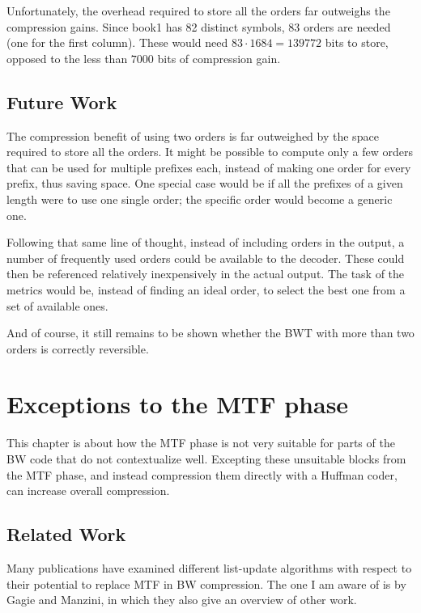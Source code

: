 \documentclass[a4paper]{scrreprt}
\begin{document}
Unfortunately, the overhead required to store all the orders far outweighs the
compression gains. Since book1 has 82 distinct symbols, 83 orders are needed
(one for the first column). These would need \(83 \cdot 1684 = 139772\) bits to
store, opposed to the less than \(7000\) bits of compression gain.

\section{Future Work}

The compression benefit of using two orders is far outweighed by the space
required to store all the orders. It might be possible to compute only a few
orders that can be used for multiple prefixes each, instead of making one order
for every prefix, thus saving space. One special case would be if all the
prefixes of a given length were to use one single order; the specific order
would become a generic one.

Following that same line of thought, instead of including orders in the output,
a number of frequently used orders could be available to the decoder. These
could then be referenced relatively inexpensively in the actual output. The task
of the metrics would be, instead of finding an ideal order, to select the best
one from a set of available ones.

And of course, it still remains to be shown whether the BWT with more than two
orders is correctly reversible.

\chapter{Exceptions to the MTF phase}

This chapter is about how the MTF phase is not very suitable for parts of the BW
code that do not contextualize well. Excepting these unsuitable blocks from the
MTF phase, and instead compression them directly with a Huffman coder, can
increase overall compression.

\section{Related Work}

Many publications have examined different list-update algorithms with respect to
their potential to replace MTF in BW compression. The one I am aware of is by
Gagie and Manzini\cite{gagie2007listupdate}, in which they also give an overview
of other work.
\end{document}
